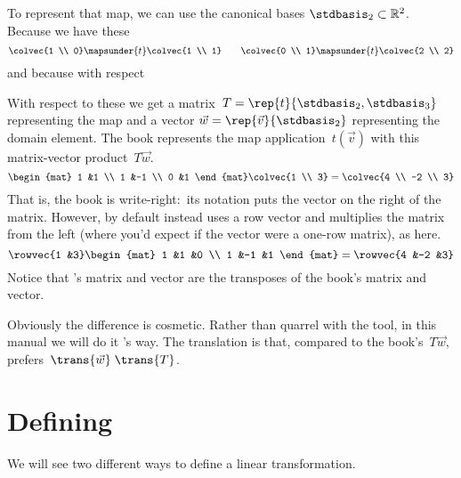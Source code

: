 To represent that map, we can use the canonical bases $\stdbasis_2\subset\Re^2$.
Because we have these
\begin{equation*}
  \colvec{1 \\ 0}\mapsunder{t}\colvec{1 \\ 1}
  \qquad
  \colvec{0 \\ 1}\mapsunder{t}\colvec{2 \\ 2}
\end{equation*}
and because with respect

With respect to these we get  
a matrix~$T=\rep{t}{\stdbasis_2,\stdbasis_3}$ representing the map 
and a vector $\vec{w}=\rep{\vec{v}}{\stdbasis_2}$ representing
the domain element.
The book represents 
the map application~$t(\vec{v})$ 
with this matrix-vector product~$T\vec{w}$.
\begin{equation*}
  \begin{mat}
    1 &1 \\
    1 &-1 \\
    0 &1
  \end{mat}
  \colvec{1 \\ 3}
  =
  \colvec{4 \\ -2 \\ 3}
\end{equation*}
That is, the book is write-right:~its notation puts the vector on the right 
of the matrix.
However, by default \Sage{} instead
uses a row vector and multiplies the matrix from the left
(where you'd expect if the vector were a one-row matrix),
as here.
\begin{equation*}
  \rowvec{1 &3}
  \begin{mat}
    1 &1  &0 \\
    1 &-1 &1
  \end{mat}
  =
  \rowvec{4 &-2 &3}
\end{equation*}
Notice that \Sage{}'s matrix and vector are the transposes of 
the book's matrix and vector.

Obviously the difference is cosmetic.
Rather than quarrel with the tool, in this manual we will do it
\Sage's way.
The translation is that, compared to the book's~$T\vec{w}$,
\Sage{} prefers~$\trans{\vec{w}}\;\trans{T}$.



  

\section{Defining}
We will see two different ways to define a linear transformation.

